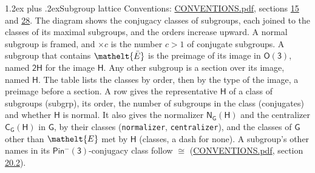 \documentclass[10pt,a4paper]{article}
\makeatletter
\renewcommand\section{\@startsection{section}{1}{\z@}{-3ex plus -1ex minus -.2ex}%
  {1.2ex plus .2ex}{\normalfont\large\sffamily\bfseries\color{parttitle}}}
\numberwithin{equation}{section}
\newcommand{\eltfont}[1]{{\let\sigma\eltsigma\mathelt{#1}}}
\newcommand{\grp}[1]{\mathsf{#1}}
\newcommand{\cls}[1]{\eltfont{#1}}
\newcommand{\elt}[1]{\eltfont{#1}}
\newcommand{\samecls}{\cong}
\newcommand{\barred}[1]{\bar{#1}}
\newcommand{\secondclass}{\mathrm{b}}
\makeatother
\begin{document}
\section{Subgroup lattice}\label{s:subgroups}
Conventions: \href{../../CONVENTIONS.pdf}{CONVENTIONS.pdf}, sections \href{../../../rotation/CONVENTIONS.pdf\#conv.15}{15} and \href{../../CONVENTIONS.pdf\#conv.28}{28}.
The diagram shows the conjugacy classes of subgroups, each joined to the classes of its maximal subgroups, and the orders increase upward. \label{n:index.conjugates.c}A normal subgroup is framed, and ${\times}c$ is the number $c > 1$ of conjugate subgroups. \label{n:group.H}A subgroup that contains $\elt{\barred{E}}$ is the preimage of its image in $\grp{O(3)}$, named $\grp{2H}$ for the image $\grp{H}$. Any other subgroup is a section over its image, named $\grp{H}$. The table lists the classes by order, then by the type of the image, a preimage before a section. \label{n:head.subgroup}\label{n:head.order}\label{n:head.conjugates}\label{n:head.normal}A row gives the representative $\grp{H}$ of a class of subgroups (subgrp), its order, the number of subgroups in the class (conjugates) and whether $\grp{H}$ is normal. \label{n:group.normalizer}\label{n:group.centralizer}\label{n:head.classes}It also gives the normalizer $\grp{N}_{\grp{G}}(\grp{H})$ and the centralizer $\grp{C}_{\grp{G}}(\grp{H})$ in $\grp{G}$, by their classes (\texttt{normalizer}, \texttt{centralizer}), and the classes of $\grp{G}$ other than $\cls{E}$ met by $\grp{H}$ (classes, a dash for none). A subgroup's other names in its \href{Pinminus3.pdf}{$\grp{Pin^{-}(3)}$}-conjugacy class follow $\samecls$ (\href{../../CONVENTIONS.pdf}{CONVENTIONS.pdf}, section \href{../../CONVENTIONS.pdf\#conv.20.2}{20.2}).
\begin{center}
\end{center}
\end{document}
